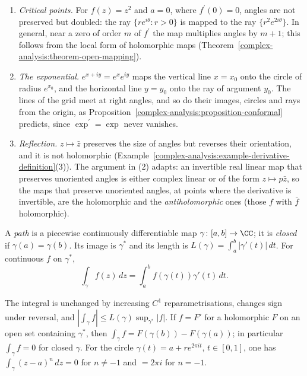 \begin{example}\label{complex-analysis:example-conformal}
\begin{enumerate}
\item \emph{Critical points.} For $f(z) = z^2$ and $a = 0$, where $f^{\prime}(0) = 0$, angles are not preserved but doubled: the ray $\{re^{i\theta} : r > 0\}$ is mapped to the ray $\{r^2e^{2i\theta}\}$. In
general, near a zero of order $m$ of $f^{\prime}$ the map multiplies angles by $m + 1$; this follows from the local form of holomorphic maps (Theorem~\ref{complex-analysis:theorem-open-mapping}).
\item \emph{The exponential.} $e^{x + iy} = e^xe^{iy}$ maps the vertical line $x = x_0$ onto the circle of radius $e^{x_0}$, and the horizontal line $y = y_0$ onto the ray of argument $y_0$. The lines of the
grid meet at right angles, and so do their images, circles and rays from the origin, as Proposition~\ref{complex-analysis:proposition-conformal} predicts, since $\exp^{\prime} = \exp$ never vanishes.
\item \emph{Reflection.} $z \mapsto \bar z$ preserves the size of angles but reverses their orientation, and it is not holomorphic
(Example~\ref{complex-analysis:example-derivative-definition}(3)). The argument in (2) adapts: an invertible real linear map that preserves unoriented angles is either complex linear or of the form
$z \mapsto p\bar z$, so the maps that preserve unoriented angles, at points where the derivative is invertible, are the holomorphic and the \emph{antiholomorphic} ones (those $f$ with $\bar f$ holomorphic).
\end{enumerate}
\end{example}

\begin{definition}\label{complex-analysis:definition-path-integral}
A \emph{path} is a piecewise continuously differentiable map $\gamma \colon [a, b] \to \CC$; it is \emph{closed} if $\gamma(a) = \gamma(b)$. Its image is $\gamma^*$ and its length is
$L(\gamma) = \int_a^b|\gamma'(t)|\,dt$. For continuous $f$ on $\gamma^*$,
\[
\int_\gamma f(z)\,dz = \int_a^bf(\gamma(t))\gamma'(t)\,dt.
\]
\end{definition}

\begin{lemma}\label{complex-analysis:lemma-path-integral}
The integral is unchanged by increasing $C^1$ reparametrisations, changes sign under reversal, and $|\int_\gamma f| \leq L(\gamma)\sup_{\gamma^*}|f|$. If $f = F'$ for a holomorphic $F$ on an open set
containing $\gamma^*$, then $\int_\gamma f = F(\gamma(b)) - F(\gamma(a))$; in particular $\int_\gamma f = 0$ for closed $\gamma$. For the circle $\gamma(t) = a + re^{2\pi it}$, $t \in [0, 1]$, one has
$\int_\gamma(z - a)^n\,dz = 0$ for $n \neq -1$ and $= 2\pi i$ for $n = -1$.
\end{lemma}

